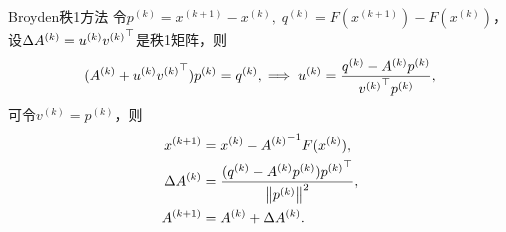 \begin{theorem}
    {Broyden秩1方法}{}
    令$p^{(k)}=x^{(k+1)}-x^{(k)},\;q^{(k)}=F(x^{(k+1)})-F(x^{(k)})$，设$\Delta A^{(k)}=u^{(k)}{v^{(k)}}^\top$是秩1矩阵，则
    \[
        (A^{(k)}+u^{(k)}{v^{(k)}}^\top)p^{(k)}=q^{(k)},\implies u^{(k)}=\frac{q^{(k)}-A^{(k)}p^{(k)}}{{v^{(k)}}^\top p^{(k)}},
    \]
    可令$v^{(k)}=p^{(k)}$，则 
    \begin{subequations}
        \begin{align}
            x^{(k+1)}&=x^{(k)}-{A^{(k)}}^{-1} F(x^{(k)}),\\
            \Delta A^{(k)}&=\frac{(q^{(k)}-A^{(k)}p^{(k)}){p^{(k)}}^\top}{\left\lVert p^{(k)}\right\rVert^2},\\
            A^{(k+1)}&=A^{(k)}+\Delta A^{(k)}.
        \end{align}
    \end{subequations}
\end{theorem}
